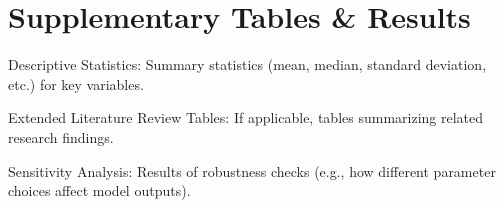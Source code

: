 \chapter{Supplementary Tables \& Results}

Descriptive Statistics: Summary statistics (mean, median, standard deviation, etc.) for key variables.

Extended Literature Review Tables: If applicable, tables summarizing related research findings.

Sensitivity Analysis: Results of robustness checks (e.g., how different parameter choices affect model outputs).

